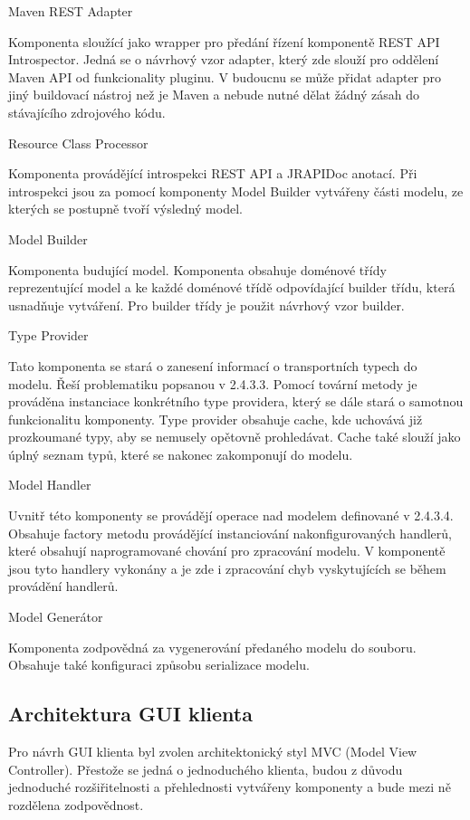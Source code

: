 \documentclass[11pt,twoside,a4paper]{book}
\begin{document}
Maven REST Adapter

Komponenta sloužící jako wrapper pro předání řízení komponentě REST API Introspector.
Jedná se o návrhový vzor adapter, který zde slouží pro oddělení Maven API od funkcionality
pluginu. V budoucnu se může přidat adapter pro jiný buildovací nástroj než je Maven a
nebude nutné dělat žádný zásah do stávajícího zdrojového kódu.

Resource Class Processor

Komponenta provádějící introspekci REST API a JRAPIDoc anotací. Při introspekci jsou za
pomocí komponenty Model Builder vytvářeny části modelu, ze kterých se postupně tvoří
výsledný model.

Model Builder

Komponenta budující model. Komponenta obsahuje doménové třídy reprezentující model a
ke každé doménové třídě odpovídající builder třídu, která usnadňuje vytváření. Pro builder
třídy je použit návrhový vzor builder.

Type Provider

Tato komponenta se stará o zanesení informací o transportních typech do modelu. Řeší
problematiku popsanou v 2.4.3.3. Pomocí tovární metody je prováděna instanciace
konkrétního type providera, který se dále stará o samotnou funkcionalitu komponenty. Type
provider obsahuje cache, kde uchovává již prozkoumané typy, aby se nemusely opětovně
prohledávat. Cache také slouží jako úplný seznam typů, které se nakonec zakomponují do
modelu.

Model Handler

Uvnitř této komponenty se provádějí operace nad modelem definované v 2.4.3.4. Obsahuje
factory metodu provádějící instanciování nakonfigurovaných handlerů, které obsahují
naprogramované chování pro zpracování modelu. V komponentě jsou tyto handlery vykonány
a je zde i zpracování chyb vyskytujících se během provádění handlerů.

Model Generátor

Komponenta zodpovědná za vygenerování předaného modelu do souboru. Obsahuje také
konfiguraci způsobu serializace modelu.

\subsection{Architektura GUI klienta}

Pro návrh GUI klienta byl zvolen architektonický styl MVC (Model View Controller).
Přestože se jedná o jednoduchého klienta, budou z důvodu jednoduché rozšiřitelnosti a
přehlednosti vytvářeny komponenty a bude mezi ně rozdělena zodpovědnost.
\end{document}
